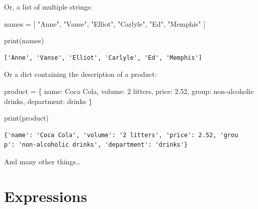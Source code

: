 \documentclass[
  11pt,
  letterpaper,
  DIV=11,
  numbers=noendperiod]{scrreprt}
\newenvironment{Shaded}{\begin{snugshade}}{\end{snugshade}}
\newcommand{\BuiltInTok}[1]{\textcolor[rgb]{0.00,0.23,0.31}{#1}}
\newcommand{\FloatTok}[1]{\textcolor[rgb]{0.68,0.00,0.00}{#1}}
\newcommand{\NormalTok}[1]{\textcolor[rgb]{0.00,0.23,0.31}{#1}}
\newcommand{\OperatorTok}[1]{\textcolor[rgb]{0.37,0.37,0.37}{#1}}
\newcommand{\StringTok}[1]{\textcolor[rgb]{0.13,0.47,0.30}{#1}}
\begin{document}
Or, a list of multiple strings:

\begin{Shaded}
\begin{Highlighting}[]
\NormalTok{names }\OperatorTok{=}\NormalTok{ [}
  \StringTok{"Anne"}\NormalTok{, }\StringTok{"Vanse"}\NormalTok{, }\StringTok{"Elliot"}\NormalTok{,}
  \StringTok{"Carlyle"}\NormalTok{, }\StringTok{"Ed"}\NormalTok{, }\StringTok{"Memphis"}
\NormalTok{]}

\BuiltInTok{print}\NormalTok{(names)}
\end{Highlighting}
\end{Shaded}

\begin{verbatim}
['Anne', 'Vanse', 'Elliot', 'Carlyle', 'Ed', 'Memphis']
\end{verbatim}

Or a dict containing the description of a product:

\begin{Shaded}
\begin{Highlighting}[]
\NormalTok{product }\OperatorTok{=}\NormalTok{ \{}
  \StringTok{\textquotesingle{}name\textquotesingle{}}\NormalTok{: }\StringTok{\textquotesingle{}Coca Cola\textquotesingle{}}\NormalTok{,}
  \StringTok{\textquotesingle{}volume\textquotesingle{}}\NormalTok{: }\StringTok{\textquotesingle{}2 litters\textquotesingle{}}\NormalTok{,}
  \StringTok{\textquotesingle{}price\textquotesingle{}}\NormalTok{: }\FloatTok{2.52}\NormalTok{,}
  \StringTok{\textquotesingle{}group\textquotesingle{}}\NormalTok{: }\StringTok{\textquotesingle{}non{-}alcoholic drinks\textquotesingle{}}\NormalTok{,}
  \StringTok{\textquotesingle{}department\textquotesingle{}}\NormalTok{: }\StringTok{\textquotesingle{}drinks\textquotesingle{}}
\NormalTok{\}}

\BuiltInTok{print}\NormalTok{(product)}
\end{Highlighting}
\end{Shaded}

\begin{verbatim}
{'name': 'Coca Cola', 'volume': '2 litters', 'price': 2.52, 'grou
p': 'non-alcoholic drinks', 'department': 'drinks'}
\end{verbatim}

And many other things\ldots{}

\section{Expressions}\label{expressions}
\end{document}

